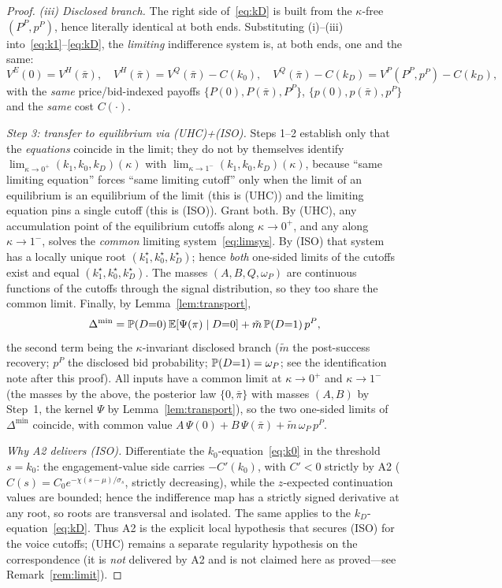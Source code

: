 \begin{proof}
\emph{(iii) Disclosed branch.} The right side of~\eqref{eq:kD} is built from the
$\kappa$-free $(P^{P},p^{P})$, hence literally identical at both ends.
Substituting (i)--(iii) into~\eqref{eq:k1}--\eqref{eq:kD}, the \emph{limiting}
indifference system is, at both ends, one and the same:
\begin{equation}\label{eq:limsys}
   V^{E}(0)=V^{H}(\bar\pi),\quad
   V^{H}(\bar\pi)=V^{Q}(\bar\pi)-C(k_0),\quad
   V^{Q}(\bar\pi)-C(k_D)=V^{P}(P^{P},p^{P})-C(k_D),
\end{equation}
with the \emph{same} price/bid-indexed payoffs $\{P(0),P(\bar\pi),P^{P}\}$,
$\{p(0),p(\bar\pi),p^{P}\}$ and the \emph{same} cost $C(\cdot)$.

\emph{Step 3: transfer to equilibrium via (UHC)+(ISO).} Steps 1--2 establish only
that the \emph{equations} coincide in the limit; they do not by themselves
identify $\lim_{\kappa\to0^{+}}(k_1,k_0,k_D)(\kappa)$ with
$\lim_{\kappa\to1^{-}}(k_1,k_0,k_D)(\kappa)$, because ``same limiting equation''
forces ``same limiting cutoff'' only when the limit of an equilibrium is an
equilibrium of the limit (this is (UHC)) and the limiting equation pins a single
cutoff (this is (ISO)). Grant both. By (UHC), any accumulation point of the
equilibrium cutoffs along $\kappa\to0^{+}$, and any along $\kappa\to1^{-}$, solves
the \emph{common} limiting system~\eqref{eq:limsys}. By (ISO) that system has a
locally unique root $(k_1^\star,k_0^\star,k_D^\star)$; hence \emph{both} one-sided
limits of the cutoffs exist and equal $(k_1^\star,k_0^\star,k_D^\star)$. The masses
$(A,B,Q,\omega_P)$ are continuous functions of the cutoffs through the signal
distribution, so they too share the common limit. Finally, by
Lemma~\ref{lem:transport},
\[
   \Delta^{\min}
   =\mathbb{P}(D{=}0)\,\mathbb{E}[\Psi(\pi)\mid D{=}0]
    +\tilde m\,\mathbb{P}(D{=}1)\,p^{P},
\]
the second term being the $\kappa$-invariant disclosed branch ($\tilde m$ the
post-success recovery; $p^{P}$ the disclosed bid probability;
$\mathbb{P}(D{=}1)=\omega_P$; see the identification note after this proof). All inputs
have a common limit at $\kappa\to0^{+}$ and $\kappa\to1^{-}$ (the masses by the
above, the posterior law $\{0,\bar\pi\}$ with masses $(A,B)$ by Step~1, the kernel
$\Psi$ by Lemma~\ref{lem:transport}), so the two one-sided limits of $\Delta^{\min}$
coincide, with common value $A\,\Psi(0)+B\,\Psi(\bar\pi)+\tilde m\,\omega_P\,p^{P}$.

\emph{Why A2 delivers (ISO).} Differentiate the $k_0$-equation~\eqref{eq:k0} in the
threshold $s=k_0$: the engagement-value side carries $-C'(k_0)$, with $C'<0$
strictly by A2 ($C(s)=C_0e^{-\chi(s-\mu)/\sigma_s}$, strictly decreasing), while the
$z$-expected continuation values are bounded; hence the indifference map has a
strictly signed derivative at any root, so roots are transversal and isolated. The
same applies to the $k_D$-equation~\eqref{eq:kD}. Thus A2 is the explicit local
hypothesis that secures (ISO) for the voice cutoffs; (UHC) remains a separate
regularity hypothesis on the correspondence (it is \emph{not} delivered by A2 and
is not claimed here as proved---see Remark~\ref{rem:limit}).
\end{proof}

